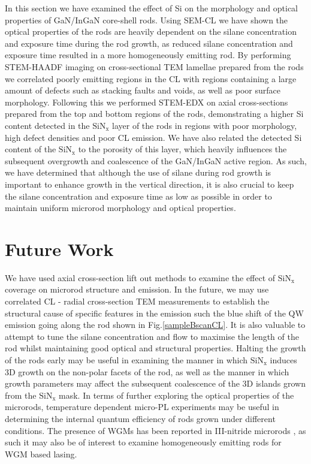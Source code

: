 In this section we have examined the effect of Si on the morphology and optical properties of GaN/InGaN core-shell rods. Using SEM-CL we have shown the optical properties of the rods are heavily dependent on the silane concentration and exposure time during the rod growth, as reduced silane concentration and exposure time resulted in a more homogeneously emitting rod. By performing STEM-HAADF imaging on cross-sectional TEM lamellae prepared from the rods we correlated poorly emitting regions in the CL with regions containing a large amount of defects such as stacking faults and voids, as well as poor surface morphology. Following this we performed STEM-EDX on axial cross-sections prepared from the top and bottom regions of the rods, demonstrating a higher Si content detected in the $\mathrm{SiN_{x}}$ layer of the rods in regions with poor morphology, high defect densities and poor CL emission. We have also related the detected Si content of the $\mathrm{SiN_{x}}$ to the porosity of this layer, which heavily influences the subsequent overgrowth and coalescence of the GaN/InGaN active region. As such, we have determined that although the use of silane during rod growth is important to enhance growth in the vertical direction, it is also crucial to keep the silane concentration and exposure time as low as possible in order to maintain uniform microrod morphology and optical properties.


\section{Future Work}
We have used axial cross-section lift out methods to examine the effect of $\mathrm{SiN_{x}}$ coverage on microrod structure and emission. In the future, we may use correlated CL - radial cross-section TEM measurements to establish the structural cause of specific features in the emission such the blue shift of the QW emission going along the rod shown in Fig.\ref{sampleBscanCL}.
It is also valuable to attempt to tune the silane concentration and flow to maximise the length of the rod whilst maintaining good optical and structural properties. Halting the growth of the rods early may be useful in examining the manner in which $\mathrm{SiN_{x}}$ induces 3D growth on the non-polar facets of the rod, as well as the manner in which growth parameters may affect the subsequent coalescence of the 3D islands grown from the $\mathrm{SiN_{x}}$ mask.
In terms of further exploring the optical properties of the microrods, temperature dependent micro-PL experiments may be useful in determining the internal quantum efficiency of rods grown under different conditions. The presence of WGMs has been reported in III-nitride microrods \cite{Tessarek2014},  as such it may also be of interest to examine homogeneously emitting rods for WGM based lasing.

